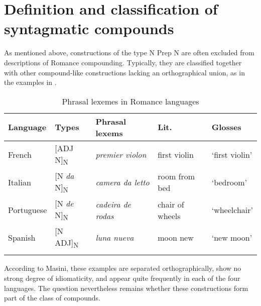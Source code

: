 \documentclass[output=paper]{langsci/langscibook}
\begin{document}
\section{Definition and classification of syntagmatic compounds} 

As mentioned above, constructions of the type N Prep N are often excluded from descriptions of Romance compounding.  Typically, they are classified together with other compound-like constructions lacking an orthographical union, as in the examples in . 

\begin{table}
\caption{Phrasal lexemes in Romance languages \citep[257]{Masini:2009}\label{Fig:1:Types of phrasal lexemes}}
\begin{tabular}{lllll}
\lsptoprule 
Language & Types & Phrasal lexems & Lit. & Glosses\\ 
\midrule
French & [ADJ N]\textsubscript{N} & \textit{premier violon} & first violin & `first violin' \\  
Italian & [N \textit{da} N]\textsubscript{N} & \textit{camera da letto} & room from bed & `bedroom' \\  
Portuguese & [N \textit{de} N]\textsubscript{N} & \textit{cadeira de rodas} & chair of wheels & `wheelchair' \\  
Spanish & [N ADJ]\textsubscript{N} & \textit{luna nueva} & moon new & `new moon' \\ 
\lspbottomrule
\end{tabular} 
\end{table}

According to Masini, these examples are separated orthographically, show no strong degree of idiomaticity, and appear quite frequently in each of the four languages. The question nevertheless remains whether these constructions form part of the class of compounds.
\end{document}
